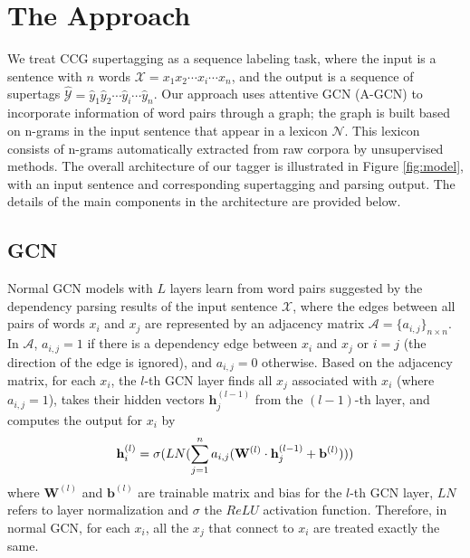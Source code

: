 \documentclass[11pt,a4paper]{article}
\begin{document}
\section{The Approach}


We treat CCG supertagging as a sequence labeling task,
where the input is a sentence with $n$ words $\mathcal{X}=x_{1}x_{2} \cdots x_{i} \cdots x_{n}$, 
and the output is 
a sequence of supertags $\widehat{\mathcal{Y}}=\widehat{y}_{1}\widehat{y}_{2} \cdots \widehat{y}_{i} \cdots \widehat{y}_{n}$.
Our approach uses attentive GCN (A-GCN) to incorporate information of word pairs through a graph;
the graph is built based on n-grams in the input sentence that appear in a lexicon $\mathcal{N}$.
This lexicon consists of 
n-grams automatically extracted from raw corpora by unsupervised methods.
The overall architecture of our tagger is illustrated in Figure \ref{fig:model}, with an input sentence and corresponding supertagging and parsing output.
The details of the main components in the architecture are provided below.



\subsection{GCN}


Normal GCN models with $L$ layers learn from word pairs suggested by the dependency parsing results of the input sentence $\mathcal{X}$, where the edges between all pairs of words $x_i$ and $x_j$ are represented by an adjacency matrix $\mathcal{A}=\{a_{i,j}\}_{n \times n}$.
In $\mathcal{A}$, $a_{i,j}=1$ if there is a dependency edge between $x_i$ and $x_j$ or $i=j$
(the direction of the edge is ignored), and $a_{i,j}=0$ otherwise.
Based on the adjacency matrix, for each $x_i$, the $l$-th GCN layer finds all $x_j$ associated with $x_i$ (where $a_{i,j}=1$), takes their hidden vectors $\mathbf{h}^{(l-1)}_j$ from the $(l-1)$-th layer, and computes the output for $x_i$ by 
\begin{equation} \label{eq: gcn}
\setlength\abovedisplayskip{6pt}
\setlength\belowdisplayskip{6pt}
    \mathbf{h}^{(l)}_{i} = \sigma (LN(\sum_{j=1}^{n} a_{i,j}
    (\mathbf{W}^{(l)} \cdot \mathbf{h}^{(l-1)}_{j} + \mathbf{b}^{(l)})))
\end{equation}
where $\mathbf{W}^{(l)}$ and $\mathbf{b}^{(l)}$ are trainable matrix and bias for the $l$-th GCN layer, $LN$ refers to layer normalization and $\sigma$ the $ReLU$ activation function.
Therefore, in normal GCN, for each $x_i$, all the $x_j$ that connect to $x_i$ are treated 
exactly the same.
\end{document}

